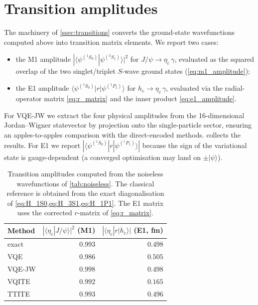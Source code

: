 \section{Transition amplitudes}
\label{sec:transitions-results}

The machinery of \cref{ssec:transitions} converts the ground-state
wavefunctions computed above into transition matrix elements. We
report two cases:
\begin{itemize}\setlength{\itemsep}{2pt}
  \item the M1 amplitude $|\langle\psi^{({}^1S_0)}|\psi^{({}^3S_1)}\rangle|^{2}$
    for $J/\psi \to \eta_c\,\gamma$, evaluated as the squared overlap
    of the two singlet/triplet $S$-wave ground states
    (\cref{eq:m1_amplitude});
  \item the E1 amplitude $\langle\psi^{({}^1S_0)}|r|\psi^{({}^1P_1)}\rangle$
    for $h_c \to \eta_c\,\gamma$, evaluated via the radial-operator
    matrix \cref{eq:r_matrix} and the inner product
    \cref{eq:e1_amplitude}.
\end{itemize}
For VQE-JW we extract the four physical amplitudes from the 16-dimensional
Jordan--Wigner statevector by projection onto the single-particle
sector, ensuring an apples-to-apples comparison with the direct-encoded
methods.  collects the results. For E1 we report
$|\langle\psi^{({}^1S_0)}|r|\psi^{({}^1P_1)}\rangle|$ because the sign
of the variational state is gauge-dependent (a converged optimisation
may land on $\pm|\psi\rangle$).

\begin{table}[htbp]
\centering
\caption{Transition amplitudes computed from the noiseless wavefunctions
  of \cref{tab:noiseless}. The classical reference is obtained from the
  exact diagonalisation of \cref{eq:H_1S0,eq:H_3S1,eq:H_1P1}. The E1
  matrix uses the corrected $r$-matrix of \cref{eq:r_matrix}.}
\label{tab:transitions}
\renewcommand{\arraystretch}{1.15}
\small
\begin{tabular}{lrr}
\toprule
Method & $|\langle\eta_c|J/\psi\rangle|^{2}$ (M1) &
$|\langle\eta_c|r|h_c\rangle|$ (E1, fm) \\
\midrule
exact      & $0.993$ & $0.498$ \\
\midrule
VQE        & $0.986$ & $0.505$ \\
VQE-JW     & $0.998$ & $0.498$ \\
VQITE      & $0.992$ & $0.165$ \\
TTITE      & $0.993$ & $0.496$ \\
\bottomrule
\end{tabular}
\end{table}

